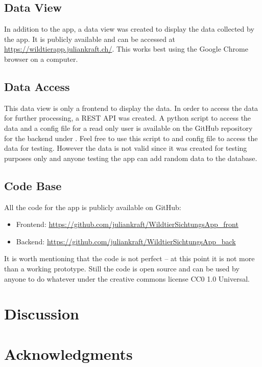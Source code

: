 \documentclass{josis}
\begin{document}
\subsection{Data View}

In addition to the app, a data view was created to display the data collected by the app. It is publicly available and can be 
accessed at \url{https://wildtierapp.juliankraft.ch/}. This works best using the Google Chrome browser on a computer.

\subsection{Data Access}

This data view is only a frontend to display the data. In order to access the data for further processing, a REST API was created.
A python script to access the data and a config file for a read only user is available on the GitHub repository 
for the backend under .
Feel free to use this script to and config file to access the data for testing. However the data is not valid since it was created for testing purposes only
and anyone testing the app can add random data to the database.

\subsection{Code Base}
All the code for the app is publicly available on GitHub:
\begin{itemize}
    \item Frontend: \url{https://github.com/juliankraft/WildtierSichtungsApp_front}
    \item Backend: \url{https://github.com/juliankraft/WildtierSichtungsApp_back}
\end{itemize}

It is worth mentioning that the code is not perfect -- at this point it is not more than a working prototype. Still the code is open source and can
be used by anyone to do whatever under the creative commons license CC0 1.0 Universal.

\section{Discussion}

\section*{Acknowledgments}
\end{document}
